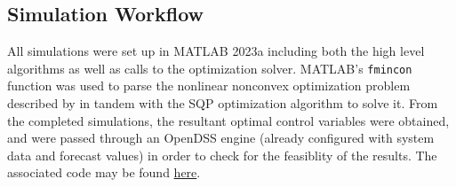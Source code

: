 \documentclass[../../outputs/main.tex]{subfiles}
\begin{document}
\subsection{Simulation Workflow}

All simulations were set up in MATLAB 2023a including both the high level algorithms as well as calls to the optimization solver. MATLAB's \texttt{fmincon} function was used to parse the nonlinear nonconvex optimization problem described by  in tandem with the SQP optimization algorithm to solve it. From the completed simulations, the resultant optimal control variables were obtained, and were passed through an OpenDSS engine (already configured with system data and forecast values) in order to check for the feasiblity of the results. The associated code may be found \href{https://github.com/Realife-Brahmin/MultiPeriod-DistOPF-Benchmark}{here}.

\end{document}
